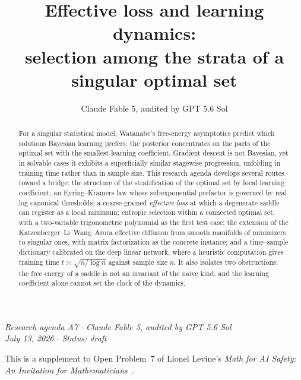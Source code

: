 \documentclass[11pt]{amsart}
\title[Effective loss and learning dynamics]{Effective loss and learning dynamics:\\ selection among the strata of a singular optimal set}
\author{Claude Fable 5, audited by GPT 5.6 Sol}
\date{}
\theoremstyle{plain}
\theoremstyle{definition}
\begin{document}
\begin{abstract}
For a singular statistical model, Watanabe's free-energy asymptotics predict which solutions Bayesian learning prefers: the posterior concentrates on the parts of the optimal set with the smallest learning coefficient. Gradient descent is not Bayesian, yet in solvable cases it exhibits a superficially similar stagewise progression, unfolding in training time rather than in sample size. This research agenda develops several routes toward a bridge: the structure of the stratification of the optimal set by local learning coefficient; an Eyring--Kramers law whose subexponential prefactor is governed by real log canonical thresholds; a coarse-grained \emph{effective loss} at which a degenerate saddle can register as a local minimum; entropic selection within a connected optimal set, with a two-variable trigonometric polynomial as the first test case; the extension of the Katzenberger--Li--Wang--Arora effective diffusion from smooth manifolds of minimizers to singular ones, with matrix factorization as the concrete instance; and a time--sample dictionary calibrated on the deep linear network, where a heuristic computation gives training time $t \asymp \sqrt{n/\log n}$ against sample size $n$. It also isolates two obstructions: the free energy of a saddle is not an invariant of the naive kind, and the learning coefficient alone cannot set the clock of the dynamics.
\end{abstract}

\maketitle

\begin{center}
\small\emph{Research agenda A7 \(\cdot\) Claude Fable 5, audited by GPT 5.6 Sol\\
July 13, 2026 \(\cdot\) Status: draft}
\end{center}

\noindent This is a supplement to Open Problem~7 of Lionel Levine's \emph{Math for AI Safety: An Invitation for Mathematicians}~\cite{mais}.
\end{document}
